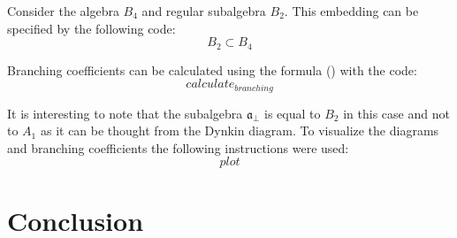 \documentclass[12pt]{article}
\theoremstyle{definition}
\newcommand{\afb}{\mathfrak{a}_{\bot}}
\begin{document}
Consider the algebra $B_{4}$ and regular subalgebra $B_{2}$. This embedding can be specified by the following code:
\begin{equation}
  \label{eq:1}
  B_{2}\subset B_{4}
\end{equation}

Branching coefficients can be calculated using the formula () with the code:
\begin{equation}
  \label{eq:2}
  calculate_{branching}
\end{equation}

It is interesting to note that the subalgebra $\afb$ is equal to $B_{2}$ in this case and not to $A_{1}$ as it can be thought from the Dynkin diagram. To visualize the diagrams and branching coefficients the following instructions were used:
\begin{equation}
  \label{eq:3}
  plot
\end{equation}
\section{Conclusion}
\label{sec:conclusion}



{}

\end{document}
